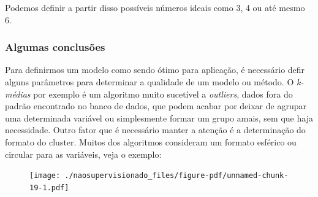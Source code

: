 \documentclass[
  letterpaper,
  DIV=11,
  numbers=noendperiod]{scrreprt}
\newenvironment{Shaded}{\begin{snugshade}}{\end{snugshade}}
\newcommand{\AttributeTok}[1]{\textcolor[rgb]{0.40,0.45,0.13}{#1}}
\newcommand{\DecValTok}[1]{\textcolor[rgb]{0.68,0.00,0.00}{#1}}
\newcommand{\FloatTok}[1]{\textcolor[rgb]{0.68,0.00,0.00}{#1}}
\newcommand{\FunctionTok}[1]{\textcolor[rgb]{0.28,0.35,0.67}{#1}}
\newcommand{\NormalTok}[1]{\textcolor[rgb]{0.00,0.23,0.31}{#1}}
\newcommand{\OtherTok}[1]{\textcolor[rgb]{0.00,0.23,0.31}{#1}}
\newcommand{\SpecialCharTok}[1]{\textcolor[rgb]{0.37,0.37,0.37}{#1}}
\begin{document}
Podemos definir a partir disso possíveis números ideais como 3, 4 ou até
mesmo 6.

\hypertarget{algumas-conclusuxf5es-1}{%
\subsubsection{Algumas conclusões}\label{algumas-conclusuxf5es-1}}

Para definirmos um modelo como sendo ótimo para aplicação, é necessário
defir alguns parâmetros para determinar a qualidade de um modelo ou
método. O \emph{k-médias} por exemplo é um algoritmo muito sucetível a
\emph{outliers}, dados fora do padrão encontrado no banco de dados, que
podem acabar por deixar de agrupar uma determinada variável ou
simplesmente formar um grupo amais, sem que haja necessidade. Outro
fator que é necessário manter a atenção é a determinação do formato do
cluster. Muitos dos algoritmos consideram um formato esférico ou
circular para as variáveis, veja o exemplo:

\begin{Shaded}
\end{Shaded}

\begin{figure}[H]

{\centering \texttt{[image: ./naosupervisionado\_files/figure-pdf/unnamed-chunk-19-1.pdf]}

}

\end{figure}
\end{document}
